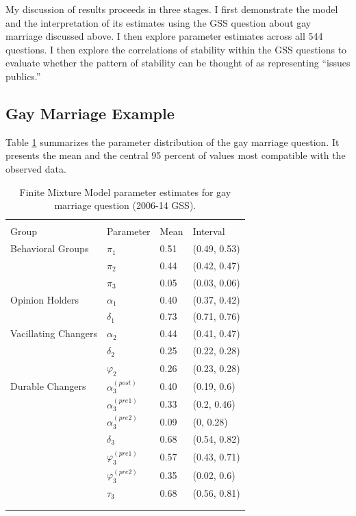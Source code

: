 \documentclass[12pt,]{article}
\begin{document}
My discussion of results proceeds in three stages. I first demonstrate the model and the interpretation of its estimates using the GSS question about gay marriage discussed above. I then explore parameter estimates across all 544 questions. I then explore the correlations of stability within the GSS questions to evaluate whether the pattern of stability can be thought of as representing ``issues publics.''

\hypertarget{gay-marriage-example}{%
\subsection{Gay Marriage Example}\label{gay-marriage-example}}

Table \ref{tab:gaymarriage} summarizes the parameter distribution of the gay marriage question. It presents the mean and the central 95 percent of values most compatible with the observed data.

\begin{table}[!htbp] \centering
  \caption{Finite Mixture Model parameter estimates for gay marriage question (2006-14 GSS).}
  \label{tab:gaymarriage}
\begin{tabular}{@{}l l l l@{}}
\\[-1.8ex]\hline 
\hline \\[-1.8ex] 
Group & Parameter & Mean & Interval \\
\hline
Behavioral Groups & $\pi_1$ & 0.51 & (0.49, 0.53)\\
 & $\pi_2$ & 0.44 & (0.42, 0.47)\\
 & $\pi_3$ & 0.05 & (0.03, 0.06)\\
Opinion Holders & $\alpha_1$ & 0.40 & (0.37, 0.42)\\
 & $\delta_1$ & 0.73 & (0.71, 0.76)\\
Vacillating Changers & $\alpha_2$ & 0.44 & (0.41, 0.47)\\
 & $\delta_2$ & 0.25 & (0.22, 0.28)\\
 & $\varphi_2$ & 0.26 & (0.23, 0.28)\\
Durable Changers & $\alpha_3^{(post)}$ & 0.40 & (0.19, 0.6)\\
 & $\alpha_3^{(pre1)}$ & 0.33 & (0.2, 0.46)\\
 & $\alpha_3^{(pre2)}$ & 0.09 & (0, 0.28)\\
 & $\delta_3$ & 0.68 & (0.54, 0.82)\\
 & $\varphi_3^{(pre1)}$ & 0.57 & (0.43, 0.71)\\
 & $\varphi_3^{(pre2)}$ & 0.35 & (0.02, 0.6)\\
 & $\tau_3$ & 0.68 & (0.56, 0.81)\\
\\[-1.8ex]\hline 
\hline \\[-1.8ex] 
\end{tabular}
\end{table}
\end{document}
